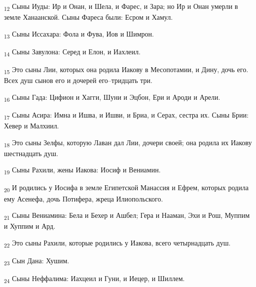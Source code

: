 \begin{tcolorbox}
\textsubscript{12} Сыны Иуды: Ир и Онан, и Шела, и Фарес, и Зара; но Ир и Онан умерли в земле Ханаанской. Сыны Фареса были: Есром и Хамул.
\end{tcolorbox}
\begin{tcolorbox}
\textsubscript{13} Сыны Иссахара: Фола и Фува, Иов и Шимрон.
\end{tcolorbox}
\begin{tcolorbox}
\textsubscript{14} Сыны Завулона: Серед и Елон, и Иахлеил.
\end{tcolorbox}
\begin{tcolorbox}
\textsubscript{15} Это сыны Лии, которых она родила Иакову в Месопотамии, и Дину, дочь его. Всех душ сынов его и дочерей его--тридцать три.
\end{tcolorbox}
\begin{tcolorbox}
\textsubscript{16} Сыны Гада: Цифион и Хагги, Шуни и Эцбон, Ери и Ароди и Арели.
\end{tcolorbox}
\begin{tcolorbox}
\textsubscript{17} Сыны Асира: Имна и Ишва, и Ишви, и Бриа, и Серах, сестра их. Сыны Брии: Хевер и Малхиил.
\end{tcolorbox}
\begin{tcolorbox}
\textsubscript{18} Это сыны Зелфы, которую Лаван дал Лии, дочери своей; она родила их Иакову шестнадцать душ.
\end{tcolorbox}
\begin{tcolorbox}
\textsubscript{19} Сыны Рахили, жены Иакова: Иосиф и Вениамин.
\end{tcolorbox}
\begin{tcolorbox}
\textsubscript{20} И родились у Иосифа в земле Египетской Манассия и Ефрем, которых родила ему Асенефа, дочь Потифера, жреца Илиопольского.
\end{tcolorbox}
\begin{tcolorbox}
\textsubscript{21} Сыны Вениамина: Бела и Бехер и Ашбел; Гера и Нааман, Эхи и Рош, Муппим и Хуппим и Ард.
\end{tcolorbox}
\begin{tcolorbox}
\textsubscript{22} Это сыны Рахили, которые родились у Иакова, всего четырнадцать душ.
\end{tcolorbox}
\begin{tcolorbox}
\textsubscript{23} Сын Дана: Хушим.
\end{tcolorbox}
\begin{tcolorbox}
\textsubscript{24} Сыны Неффалима: Иахцеил и Гуни, и Иецер, и Шиллем.
\end{tcolorbox}
